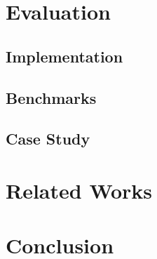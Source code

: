 \documentclass[11pt,a4paper]{article}
\begin{document}
\section{Evaluation}
\subsection{Implementation}
%
\subsection{Benchmarks}

\subsection{Case Study}

\section{Related Works}

\section{Conclusion}
\end{document}
